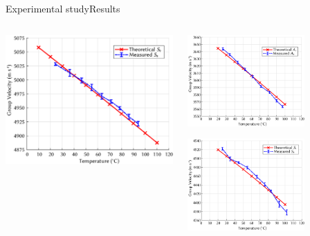 \documentclass[aspectratio=169, 9pt]{beamer}
\begin{document}
\begin{frame}{Experimental study}{Results}

  \begin{columns}
    \begin{column}{0.5\textwidth}
       \begin{center}
        \includegraphics[width=\textwidth]{images/aluplatemeasured.eps}
       \end{center}
    \end{column}
    \begin{column}{0.5\textwidth}  %
      \begin{center}
        \includegraphics[width=0.7\textwidth]{images/a1moderesult.eps}
       \end{center}
       \begin{center}
        \includegraphics[width=0.7\textwidth]{images/s1moderesult.eps}

\end{center}
\end{column}
\end{columns}
\end{frame}
\end{document}
